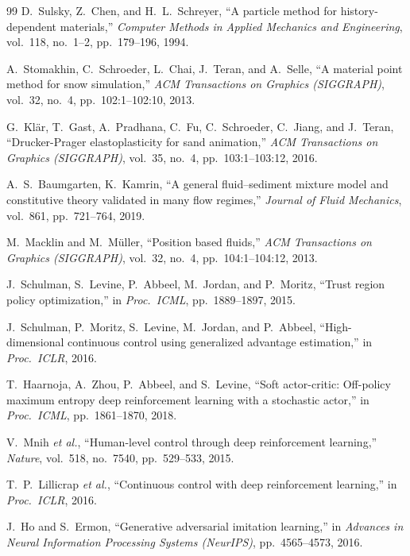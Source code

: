 \documentclass[12pt,a4paper]{article}
\begin{document}
\begin{thebibliography}{99}
D.~Sulsky, Z.~Chen, and H.~L.~Schreyer, ``A particle method for history-dependent materials,'' \textit{Computer Methods in Applied Mechanics and Engineering}, vol.~118, no.~1--2, pp.~179--196, 1994.

A.~Stomakhin, C.~Schroeder, L.~Chai, J.~Teran, and A.~Selle, ``A material point method for snow simulation,'' \textit{ACM Transactions on Graphics (SIGGRAPH)}, vol.~32, no.~4, pp.~102:1--102:10, 2013.

G.~Kl{\"a}r, T.~Gast, A.~Pradhana, C.~Fu, C.~Schroeder, C.~Jiang, and J.~Teran, ``Drucker-Prager elastoplasticity for sand animation,'' \textit{ACM Transactions on Graphics (SIGGRAPH)}, vol.~35, no.~4, pp.~103:1--103:12, 2016.

A.~S.~Baumgarten, K.~Kamrin, ``A general fluid--sediment mixture model and constitutive theory validated in many flow regimes,'' \textit{Journal of Fluid Mechanics}, vol.~861, pp.~721--764, 2019.

M.~Macklin and M.~M\"{u}ller, ``Position based fluids,'' \textit{ACM Transactions on Graphics (SIGGRAPH)}, vol.~32, no.~4, pp.~104:1--104:12, 2013.

J.~Schulman, S.~Levine, P.~Abbeel, M.~Jordan, and P.~Moritz, ``Trust region policy optimization,'' in \textit{Proc.\ ICML}, pp.~1889--1897, 2015.

J.~Schulman, P.~Moritz, S.~Levine, M.~Jordan, and P.~Abbeel, ``High-dimensional continuous control using generalized advantage estimation,'' in \textit{Proc.\ ICLR}, 2016.

T.~Haarnoja, A.~Zhou, P.~Abbeel, and S.~Levine, ``Soft actor-critic: Off-policy maximum entropy deep reinforcement learning with a stochastic actor,'' in \textit{Proc.\ ICML}, pp.~1861--1870, 2018.

V.~Mnih \textit{et al.}, ``Human-level control through deep reinforcement learning,'' \textit{Nature}, vol.~518, no.~7540, pp.~529--533, 2015.

T.~P.~Lillicrap \textit{et al.}, ``Continuous control with deep reinforcement learning,'' in \textit{Proc.\ ICLR}, 2016.

J.~Ho and S.~Ermon, ``Generative adversarial imitation learning,'' in \textit{Advances in Neural Information Processing Systems (NeurIPS)}, pp.~4565--4573, 2016.


\end{thebibliography}
\end{document}
